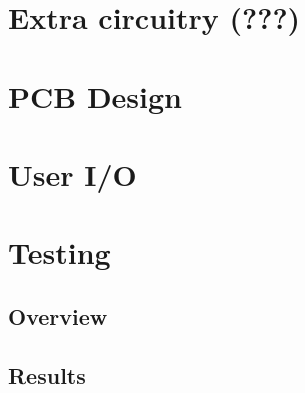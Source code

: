 \documentclass[main.tex]{subfiles}
\begin{document}
\section{Extra circuitry (???)}

\section{PCB Design}

\section{User I/O}
\section{Testing}
\subsection{Overview}
\subsection{Results}
\end{document}
